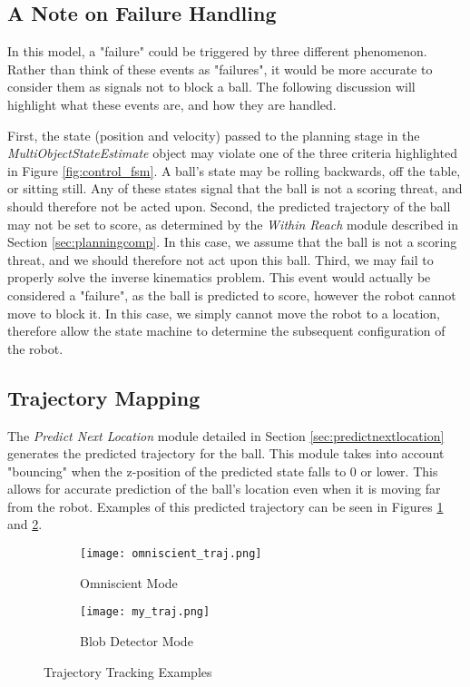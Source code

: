 \documentclass{article}
\begin{document}
\subsection{A Note on Failure Handling}
In this model, a "failure" could be triggered by three different phenomenon. Rather than think of these events as "failures", it would be more accurate to consider them as signals not to block a ball. The following discussion will highlight what these events are, and how they are handled. \par 

First, the state (position and velocity) passed to the planning stage in the \emph{MultiObjectStateEstimate} object may violate one of the three criteria highlighted in Figure  \ref{fig:control_fsm}. A ball's state may be rolling backwards, off the table, or sitting still. Any of these states signal that the ball is not a scoring threat, and should therefore not be acted upon. Second, the predicted trajectory of the ball may not be set to score, as determined by the \emph{Within Reach} module described in Section \ref{sec:planningcomp}. In this case, we assume that the ball is not a scoring threat, and we should therefore not act upon this ball. Third, we may fail to properly solve the inverse kinematics problem. This event would actually be considered a "failure", as the ball is predicted to score, however the robot cannot move to block it. In this case, we simply cannot move the robot to a location, therefore allow the state machine to determine the subsequent configuration of the robot.


\subsection{Trajectory Mapping}
The \emph{Predict Next Location} module detailed in Section \ref{sec:predictnextlocation} generates the predicted trajectory for the ball. This module takes into account "bouncing" when the z-position of the predicted state falls to 0 or lower. This allows for accurate prediction of the ball's location even when it is moving far from the robot. Examples of this predicted trajectory can be seen in Figures \ref{fig:omniscient_traj} and \ref{fig:my_traj}. 

\begin{figure}[h]
\centering
\begin{subfigure}{.5\textwidth}
  \centering
  \texttt{[image: omniscient\_traj.png]}
  \caption{\label{fig:omniscient_traj} Omniscient Mode}
\end{subfigure}%
\begin{subfigure}{.5\textwidth}
  \centering
  \texttt{[image: my\_traj.png]}
  \caption{Blob Detector Mode}
  \label{fig:my_traj}
\end{subfigure}
\caption{Trajectory Tracking Examples}
\label{fig:test}
\end{figure}
\end{document}
